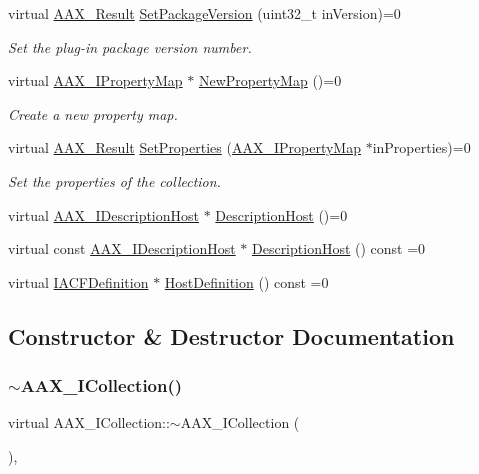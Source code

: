 \begin{DoxyCompactItemize}
virtual \mbox{\hyperlink{a00392_a4d8f69a697df7f70c3a8e9b8ee130d2f}{A\+A\+X\+\_\+\+Result}} \mbox{\hyperlink{a01777_a4e69ac93eaac9c285c2bc3ac5b25880b}{Set\+Package\+Version}} (uint32\+\_\+t in\+Version)=0
\begin{DoxyCompactList}\small\item\em Set the plug-\/in package version number. \end{DoxyCompactList}\item 
virtual \mbox{\hyperlink{a01869}{A\+A\+X\+\_\+\+I\+Property\+Map}} $\ast$ \mbox{\hyperlink{a01777_a665bac1e4e4558e0998d15a030a57407}{New\+Property\+Map}} ()=0
\begin{DoxyCompactList}\small\item\em Create a new property map. \end{DoxyCompactList}\item 
virtual \mbox{\hyperlink{a00392_a4d8f69a697df7f70c3a8e9b8ee130d2f}{A\+A\+X\+\_\+\+Result}} \mbox{\hyperlink{a01777_a0cbb609eec2550f7db3a137a826ec436}{Set\+Properties}} (\mbox{\hyperlink{a01869}{A\+A\+X\+\_\+\+I\+Property\+Map}} $\ast$in\+Properties)=0
\begin{DoxyCompactList}\small\item\em Set the properties of the collection. \end{DoxyCompactList}\item 
virtual \mbox{\hyperlink{a01793}{A\+A\+X\+\_\+\+I\+Description\+Host}} $\ast$ \mbox{\hyperlink{a01777_aeed6374265a6c9b4c59f752644feba02}{Description\+Host}} ()=0
\item 
virtual const \mbox{\hyperlink{a01793}{A\+A\+X\+\_\+\+I\+Description\+Host}} $\ast$ \mbox{\hyperlink{a01777_a47ed935bdc38c43efa64ec36cee03a7c}{Description\+Host}} () const =0
\item 
virtual \mbox{\hyperlink{a01413}{I\+A\+C\+F\+Definition}} $\ast$ \mbox{\hyperlink{a01777_a8346a9084bf81e1834990aec2685640b}{Host\+Definition}} () const =0
\end{DoxyCompactItemize}


\subsection{Constructor \& Destructor Documentation}
\mbox{\label{a01777_a830a9afde909fafd772f2d935a78e337}} 
\subsubsection{\texorpdfstring{$\sim$AAX\_ICollection()}{~AAX\_ICollection()}}
{\footnotesize\ttfamily virtual A\+A\+X\+\_\+\+I\+Collection\+::$\sim$\+A\+A\+X\+\_\+\+I\+Collection (\begin{DoxyParamCaption}{ }\end{DoxyParamCaption})\hspace{0.3cm}{\ttfamily [inline]}, {\ttfamily [virtual]}}



